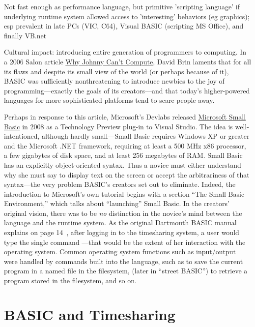 \documentclass{article}
\begin{document}
Not fast enough as performance language, but primitive 'scripting
language' if underlying runtime system allowed access to 'interesting'
behaviors (eg graphics); esp prevalent in late PCs (VIC, C64), Visual
BASIC (scripting MS Office), and finally VB.net

Cultural impact: introducing entire generation of programmers to
computing.
In a 2006 Salon article \href{www.salon.com/2006/09/14/basic_2}{Why Johnny
  Can't Compute},
David Brin laments that for
all its flaws and despite its small view of the world (or perhaps
because of it), BASIC was sufficiently
nonthreatening to introduce newbies to the joy of programming---exactly
the goals of its creators---and that today's higher-powered languages
for more sophisticated platforms tend to scare people away.

Perhaps in response to this article, Microsoft's Devlabs 
released \href{http://smallbasic.com}{Microsoft Small Basic} in 2008 as a
Technology Preview plug-in to Visual Studio.
The idea is well-intentioned, although hardly small---Small Basic
requires Windows XP or greater and the Microsoft .NET framework,
requiring at least a 500
MHz x86 processor, a few gigabytes of disk space, and at least 256
megabytes of RAM.
Small Basic has an explicitly
object-oriented syntax.  Thus a novice must either understand why she
must say  to display text on the
screen or accept the arbitrariness of that syntax---the very problem
BASIC's creators set out to eliminate.  Indeed, the introduction to
Microsoft's own tutorial begins with a section ``The Small Basic
Environment,'' which talks about ``launching'' Small Basic.  In the
creators' original vision, there was to be \emph{no} distinction in the
novice's mind between the language and the runtime system.  As the
original Dartmouth BASIC manual explains on page
14~\cite{dartmouth_basic_manual}, after logging in to the timesharing
system, a user would type the single command ---that would be the
extent of her interaction with the operating system.  Common operating
system functions such as input/output were handled by commands built
into the language, such as  to save the current program in a
named file in the filesystem,  (later  in ``street
BASIC'') to retrieve a program stored in the filesystem, and so on.

\section{BASIC and Timesharing}
\end{document}
